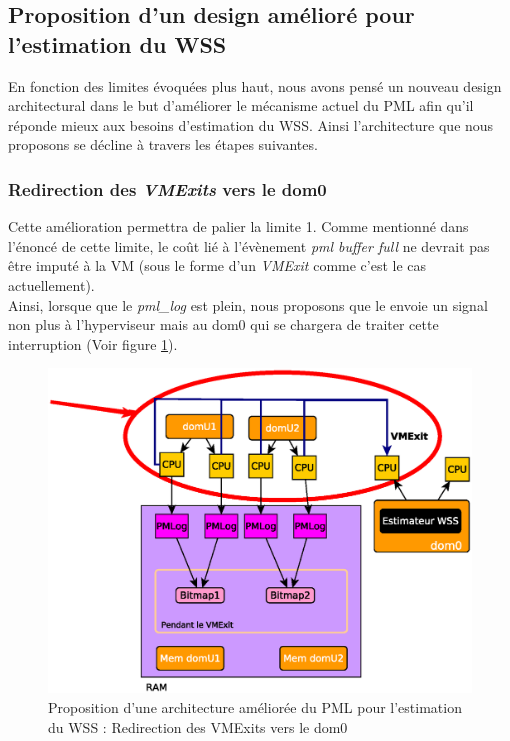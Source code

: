 \subsection{Proposition d'un design amélioré pour l'estimation du WSS} 
En fonction des limites évoquées plus haut, nous avons pensé un nouveau design architectural dans le but d'améliorer le mécanisme actuel du PML afin qu'il réponde mieux aux besoins d'estimation du WSS. Ainsi l'architecture que nous proposons se décline à travers les étapes suivantes.

\subsubsection{Redirection des \textit{VMExits} vers le dom0}
Cette amélioration permettra de palier la limite 1. Comme mentionné dans l'énoncé de cette limite, le coût lié à l'évènement \textit{pml buffer full} ne devrait pas être imputé à la VM (sous le forme d'un \textit{VMExit} comme c'est le cas actuellement).\\
Ainsi, lorsque que le \textit{pml\_log} est plein, nous proposons que le envoie un signal non plus à l'hyperviseur mais au dom0 qui se chargera de traiter cette interruption (Voir figure \ref{fig:redirection_vmexit}).

\begin{figure}[H]
    \centering
    \includegraphics[scale=.8]{chapters/3/fig3/PMLOverview1}
    \caption{Proposition d'une architecture améliorée du PML pour l'estimation du WSS : Redirection des VMExits vers le dom0}
    \label{fig:redirection_vmexit}
\end{figure}

